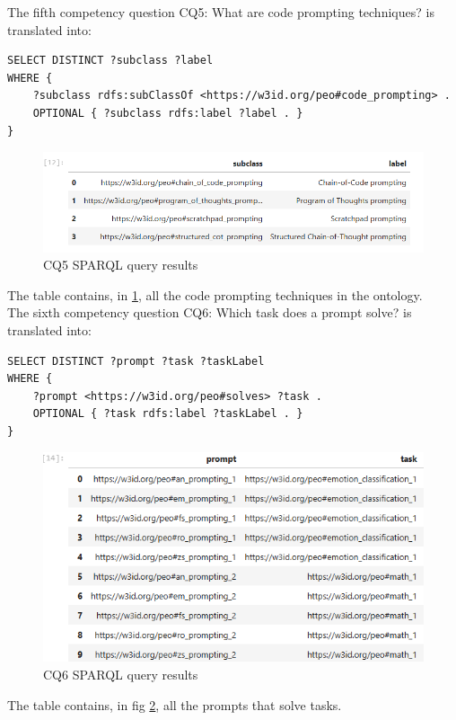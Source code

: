 The fifth competency question CQ5: What are code prompting techniques? is translated into:
\begin{lstlisting}
SELECT DISTINCT ?subclass ?label
WHERE {
    ?subclass rdfs:subClassOf <https://w3id.org/peo#code_prompting> .
    OPTIONAL { ?subclass rdfs:label ?label . }
}  
\end{lstlisting}

\begin{figure}[H]
    \centering
    \includegraphics[width=0.9\linewidth]{Figures/fig_51.png}
    \caption{CQ5 SPARQL query results}
    \label{fig:51}
\end{figure}
The table contains, in \ref{fig:51}, all the code prompting techniques in the ontology.\\

The sixth competency question CQ6: Which task does a prompt solve? is translated into:
\begin{lstlisting}
SELECT DISTINCT ?prompt ?task ?taskLabel
WHERE {
    ?prompt <https://w3id.org/peo#solves> ?task .
    OPTIONAL { ?task rdfs:label ?taskLabel . }
}
\end{lstlisting}

\begin{figure}[H]
    \centering
    \includegraphics[width=0.9\linewidth]{Figures/fig_52.png}
    \caption{CQ6 SPARQL query results}
    \label{fig:52}
\end{figure}
The table contains, in fig \ref{fig:52}, all the prompts that solve tasks.\\

